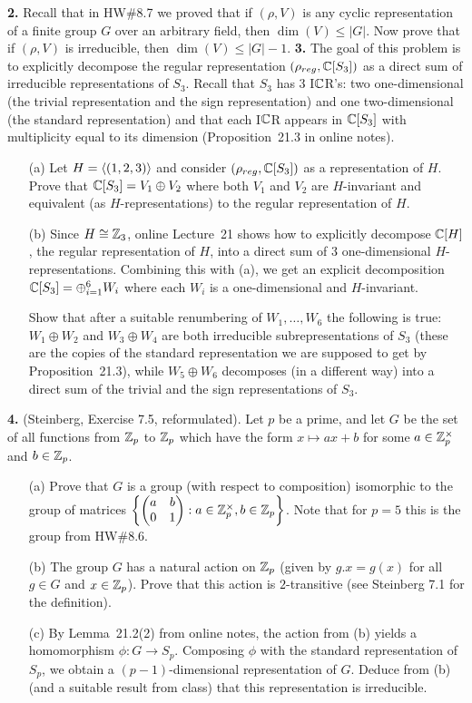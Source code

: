 \documentclass[12pt]{amsart}
\begin{document}
\skv
{\bf 2.} Recall that in HW\#8.7 we proved that if $(\rho,V)$ is any cyclic representation of a finite group $G$ over an arbitrary field, then 
$\dim(V)\leq |G|$. Now prove that if $(\rho,V)$ is irreducible, then
$\dim(V)\leq |G|-1$.
\skv
{\bf 3.} The goal of this problem is to explicitly decompose the regular representation $(\rho_{reg},{\mathbb C}[S_3])$ as a direct sum of irreducible representations of $S_3$. Recall that
$S_3$ has 3 I${\mathbb C}$R's: two one-dimensional (the trivial representation and the sign representation) and one two-dimensional (the standard representation) and that each I${\mathbb C}$R appears in ${\mathbb C}[S_3]$ with multiplicity equal to its dimension (Proposition~21.3 in online notes).
\begin{itemize}
\item[(a)] Let $H={\langle} (1,2,3){\rangle}$ and consider $(\rho_{reg},{\mathbb C}[S_3])$ as a representation of $H$. Prove that ${\mathbb C}[S_3]=V_1\oplus V_2$ where both 
$V_1$ and $V_2$ are $H$-invariant and equivalent (as $H$-representations) 
to the regular representation of $H$.
\item[(b)] Since $H\cong {\mathbb Z}_3$, online Lecture~21 shows how to explicitly decompose ${\mathbb C}[H]$, the regular representation of $H$, into a direct sum of 3 one-dimensional $H$-representations.
Combining this with (a), we get an explicit decomposition
${\mathbb C}[S_3]=\oplus_{i=1}^6 W_i$ where each $W_i$ is a one-dimensional 
and $H$-invariant. 

Show that after a suitable renumbering of $W_1,\ldots, W_6$
the following is true: $W_1\oplus W_2$ and $W_3\oplus W_4$ are both irreducible
subrepresentations of $S_3$ (these are the copies of the standard representation we are supposed to get by Proposition~21.3), while $W_5\oplus W_6$ decomposes (in a different way) into a direct sum of the trivial and the sign representations of $S_3$. 
\end{itemize}
\skv
{\bf 4.} (Steinberg, Exercise 7.5, reformulated). Let $p$ be a prime, and let 
$G$ be the set of all functions from ${\mathbb Z}_p$ to ${\mathbb Z}_p$ which have the form
$x\mapsto ax+b$ for some $a\in{\mathbb Z}_p^{\times}$ and $b\in{\mathbb Z}_p$.
\begin{itemize}
\item[(a)] Prove that $G$ is a group (with respect to composition) isomorphic to the group of matrices $\left\{\begin{pmatrix} a&b\\ 0&1\end{pmatrix}:
a\in{\mathbb Z}_p^{\times}, b\in{\mathbb Z}_p\right\}$. Note that for $p=5$ this is the group
from HW\#8.6.
\item[(b)] The group $G$ has a natural action on ${\mathbb Z}_p$ (given by
$g.x=g(x)$ for all $g\in G$ and $x\in{\mathbb Z}_p$). Prove that this action is
$2$-transitive (see Steinberg 7.1 for the definition).
\item[(c)] By Lemma~21.2(2) from online notes, the action from (b) yields a homomorphism
$\phi:G\to S_p$. Composing $\phi$ with the standard representation of $S_p$,
we obtain a $(p-1)$-dimensional representation of $G$. Deduce from (b) (and a suitable result from class) that this representation is irreducible. 
\end{itemize}
\end{document}
